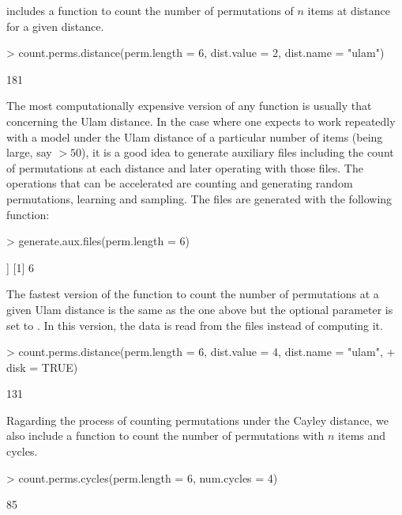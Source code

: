\documentclass[article,nojss]{jss}
\begin{document}
 includes a function to count the number of permutations of $n$ items at distance  for a given distance.
\begin{Schunk}
\begin{Sinput}
> count.perms.distance(perm.length = 6, dist.value = 2, dist.name = "ulam")
\end{Sinput}
\begin{Soutput}
[1] 181
\end{Soutput}
\end{Schunk}

The most computationally expensive version of any function is usually that concerning the Ulam distance. In the case where one expects to work repeatedly with a model under the Ulam distance of a particular  number of items (being  large, say $>50$), it is a good idea to generate auxiliary files including the count of permutations at each distance and later operating with those files. The operations that can be accelerated are counting and generating random permutations, learning and sampling. The files are generated with the following function:

\begin{Schunk}
\begin{Sinput}
> generate.aux.files(perm.length = 6)
\end{Sinput}
\begin{Soutput}
[[1]]
[1] 6
\end{Soutput}
\end{Schunk}

The fastest version of the function to count the number of permutations at a given Ulam distance is the same as the one above but the optional parameter  is set to . In this version, the data is read from the files instead of computing it.  

\begin{Schunk}
\begin{Sinput}
> count.perms.distance(perm.length = 6, dist.value = 4, dist.name = "ulam", 
+     disk = TRUE)
\end{Sinput}
\begin{Soutput}
[1] 131
\end{Soutput}
\end{Schunk}

Ragarding the process of counting permutations under the Cayley distance, we also include a function to count the number of permutations with $n$ items and  cycles. 
\begin{Schunk}
\begin{Sinput}
> count.perms.cycles(perm.length = 6, num.cycles = 4)
\end{Sinput}
\begin{Soutput}
[1] 85
\end{Soutput}
\end{Schunk}
\end{document}
